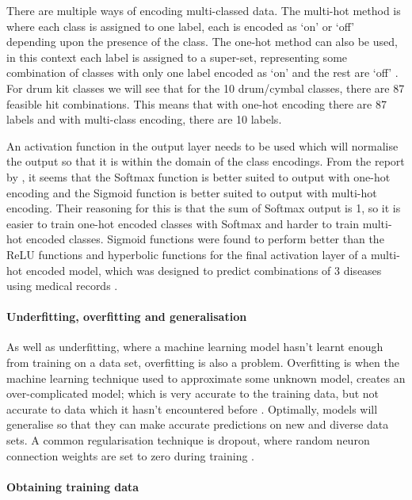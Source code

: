 \documentclass[12pt]{article}
\begin{document}
	There are multiple ways of encoding multi-classed data. The multi-hot method is where each class is assigned to one label, each is encoded as `on' or `off' depending upon the presence of the class. The one-hot method can also be used, in this context each label is assigned to a super-set, representing some combination of classes with only one label encoded as `on' and the rest are `off' \parencite{ghlmowyzz2017}. For drum kit classes we will see that for the 10 drum/cymbal classes, there are 87 feasible hit combinations. This means that with one-hot encoding there are 87 labels and with multi-class encoding, there are 10 labels.\medskip
	
	An activation function in the output layer needs to be used which will normalise the output so that it is within the domain of the class encodings. From the report by \textcite{ghlmowyzz2017}, it seems that the Softmax function is better suited to output with one-hot encoding and the Sigmoid function is better suited to output with multi-hot encoding. Their reasoning for this is that the sum of Softmax output is 1, so it is easier to train one-hot encoded classes with Softmax and harder to train multi-hot encoded classes. Sigmoid functions were found to perform better than the ReLU functions and hyperbolic functions for the final activation layer of a multi-hot encoded model, which was designed to predict combinations of 3 diseases using medical records \parencite{ghlmowyzz2017}.\medskip
	
	\paragraph{Underfitting, overfitting and generalisation} \label{sec:overfitting}
	As well as underfitting, where a machine learning model hasn't learnt enough from training on a data set, overfitting is also a problem. Overfitting is when the machine learning technique used to approximate some unknown model, creates an over-complicated model; which is very accurate to the training data, but not accurate to data which it hasn't encountered before  \parencite[p.143-145]{Rojas}. Optimally, models will generalise so that they can make accurate predictions on new and diverse data sets. A common regularisation technique is dropout, where random neuron connection weights are set to zero during training \parencite{Hinton2014}.\medskip
	
	\paragraph{Obtaining training data}
	\label{sec:data_augmentation}
	
\end{document}

